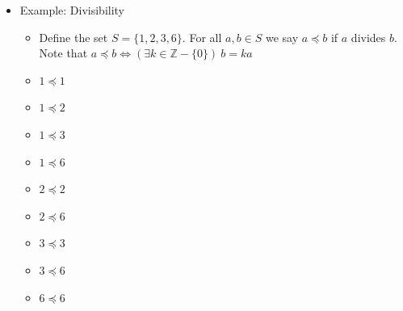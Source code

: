 \documentclass{article}
\begin{document}
\begin{itemize}
    \begin{itemize}
        \item $S=\{1,2\}$
        \item The power set (set of all subsets) of $S$ is $P(S) = \{ \emptyset, \{1\},\{2\},\{1,2\}\}$
        \item The partial order denoted by $\subseteq$ is the subset relation
        \item For subsets of $A$ and $B$ of $S$, $A \subseteq B$ if every element of $A$ is also an element of $B$
        \item Poset example:
        \begin{itemize}
            \item $\emptyset \subseteq \emptyset$
            \item $\emptyset \subseteq \{1\}$
            \item $\emptyset \subseteq \{2\}$
            \item $\emptyset \subseteq \{1,2\}$
            \item $\{1\} \subseteq \{1\}$
            \item $\{1\} \subseteq \{1,2\}$
            \item $\{2\} \subseteq \{2\}$
            \item $\{2\} \subseteq \{1,2\}$
            \item $\{1,2\} \subseteq \{1,2\}$
            \item The relation is reflexive, antisymmetric, and transitive
        \end{itemize}
    \end{itemize}
    \item Example: Divisibility
    \begin{itemize}
        \item Define the set $S = \{1,2,3,6\}$. For all $a,b \in S$ we say $a \preceq b$ if $a$ divides $b$. Note that $a \preceq b \Longleftrightarrow (\exists k \in \mathbb{Z} - \{0\}) \ b = ka$
        \item $1 \preceq 1$
        \item $1 \preceq 2$
        \item $1 \preceq 3$
        \item $1 \preceq 6$
        \item $2 \preceq 2$
        \item $2 \preceq 6$
        \item $3 \preceq 3$
        \item $3 \preceq 6$
        \item $6 \preceq 6$

\end{itemize}
\end{itemize}
\end{document}
